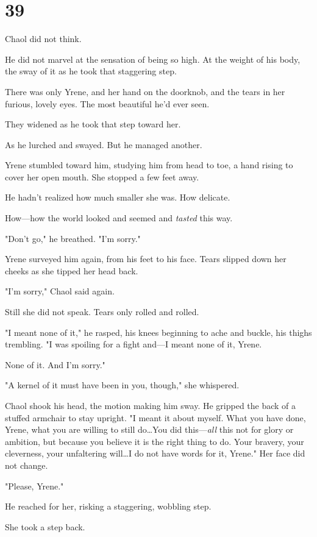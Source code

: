 
\chapter{39}

Chaol did not think.

He did not marvel at the sensation of being so high.
At the weight of his body, the sway of it as he took that staggering step.

There was only Yrene, and her hand on the doorknob, and the tears in her furious, lovely eyes.
The most beautiful he'd ever seen.

They widened as he took that step toward her.

As he lurched and swayed.
But he managed another.

Yrene stumbled toward him, studying him from head to toe, a hand rising to cover her open mouth.
She stopped a few feet away.

He hadn't realized how much smaller she was.
How delicate.

How---how the world looked and seemed and \emph{tasted} this way.

"Don't go," he breathed.
"I'm sorry."

Yrene surveyed him again, from his feet to his face.
Tears slipped down her cheeks as she tipped her head back.

"I'm sorry," Chaol said again.

Still she did not speak.
Tears only rolled and rolled.

"I meant none of it," he rasped, his knees beginning to ache and buckle, his thighs trembling.
"I was spoiling for a fight and---I meant none of it, Yrene.

None of it.
And I'm sorry."

"A kernel of it must have been in you, though," she whispered.

Chaol shook his head, the motion making him sway.
He gripped the back of a stuffed armchair to stay upright.
"I meant it about myself.
What you have done, Yrene, what you are willing to still do\ldots You did this---\emph{all} this not for glory or ambition, but because you believe it is the right thing to do.
Your bravery, your cleverness, your unfaltering will\ldots I do not have words for it, Yrene."
Her face did not change.

"Please, Yrene."

He reached for her, risking a staggering, wobbling step.

She took a step back.

